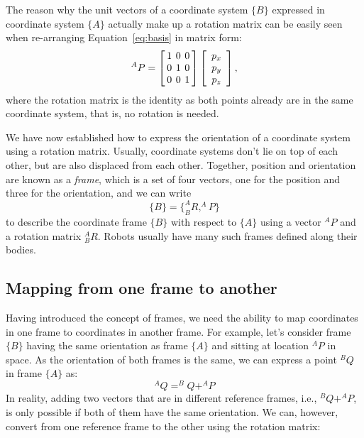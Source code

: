 The reason why the unit vectors of a coordinate system $\{B\}$ expressed in coordinate system $\{A\}$ actually make up a rotation matrix can be easily seen when re-arranging Equation~\ref{eq:basis} in matrix form:
\begin{equation}
^AP=\left[ \arraycolsep=2pt%
\begin{array}{ccc}1 & 0 & 0\\0 & 1 & 0\\0 & 0 & 1\end{array}\right]\left[\begin{array}{c}p_x\\p_y\\p_z\end{array}
\right],
\end{equation}
where the rotation matrix is the identity as both points already are in the same coordinate system, that is, no rotation is needed.

We have now established how to express the orientation of a coordinate system using a rotation matrix. Usually, coordinate systems don't lie on top of each other, but are also displaced from each other.
Together, position and orientation are known as a \textsl{frame}, which is a set of four vectors, one for the position and three for the orientation, and we can write
%
\begin{equation}
\{B\}=\{^A_BR, ^AP\}
\end{equation}
%
to describe the coordinate frame $\{B\}$ with respect to $\{A\}$ using a vector $^AP$ and a rotation matrix $^A_BR$. Robots usually have many such frames defined along their bodies.

\subsection{Mapping from one frame to another}


Having introduced the concept of frames, we need the ability to map coordinates in one frame to coordinates in another frame. For example, let's consider frame $\{B\}$ having the same orientation as frame $\{A\}$ and sitting at location $^AP$ in space. As the orientation of both frames is the same, we can express a point $ ^BQ$ in frame $\{A\}$ as:
%
\begin{equation}
^AQ=^BQ+^AP
\end{equation}
%
In reality, adding two vectors that are in different reference frames, i.e., $ ^BQ+^AP$, is only possible if both of them have the same orientation. We can, however, convert from one reference frame to the other using the rotation matrix:

